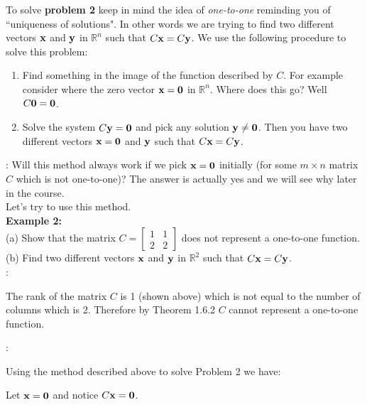 \documentclass[12pt]{article}
\begin{document}
\noindent To solve {\bf problem 2} keep in mind the idea of {\it one-to-one} reminding you of ``uniqueness of solutions".  In other words we are trying to find two different vectors ${\bf x}$ and ${\bf y}$ in $\mathbb{R}^n$ such that $C{\bf x} = C{\bf y}$.  We use the following procedure to solve this problem:

\begin{enumerate}
\item Find something in the image of the function described by $C$.  For example consider where the zero vector ${\bf x}={\bf 0}$ in $\mathbb{R}^n$.  Where does this go?  Well $C{\bf 0} = {\bf 0}$.

\item Solve the system $C{\bf y} = {\bf 0}$ and pick any solution ${\bf y}\neq {\bf 0}$.  Then you have two different vectors ${\bf x}={\bf 0}$ and ${\bf y}$ such that $C{\bf x} =C{\bf y}$.
\end{enumerate}

:  Will this method always work if we pick ${\bf x}={\bf 0}$ initially (for some $m\times n$ matrix $C$ which is not one-to-one)?  The answer is actually yes and we will see why later in the course.\\

\noindent Let's try to use this method.\\
{\bf Example 2:} \\

\noindent (a) Show that the matrix $C=\left[ \begin{array}{cc} 1 &1  \\ 2 & 2  \end{array} \right]$ does not represent a one-to-one function. \\

\noindent (b) Find two different vectors ${\bf x}$ and ${\bf y}$ in $\mathbb{R}^2$ such that $C{\bf x} = C{\bf y}$.  \\

:  

\noindent The rank of the matrix $C$ is 1 (shown above) which is not equal to the number of columns which is 2.  Therefore by Theorem 1.6.2 $C$ cannot represent a one-to-one function.

:  

\noindent Using the method described above to solve Problem 2 we have:

\noindent Let ${\bf x} = {\bf 0}$ and notice $C{\bf x} = {\bf 0}$.\\
\end{document}
